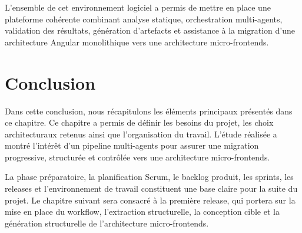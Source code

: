 





L'ensemble de cet environnement logiciel a permis de mettre en place une plateforme cohérente combinant analyse statique, orchestration multi-agents, validation des résultats, génération d'artefacts et assistance à la migration d'une architecture Angular monolithique vers une architecture micro-frontends.

\section*{Conclusion}

Dans cette conclusion, nous récapitulons les éléments principaux présentés dans ce chapitre. Ce chapitre a permis de définir les besoins du projet, les choix architecturaux retenus ainsi que l'organisation du travail. L'étude réalisée a montré l'intérêt d'un pipeline multi-agents pour assurer une migration progressive, structurée et contrôlée vers une architecture micro-frontends.

La phase préparatoire, la planification Scrum, le backlog produit, les sprints, les releases et l'environnement de travail constituent une base claire pour la suite du projet. Le chapitre suivant sera consacré à la première release, qui portera sur la mise en place du workflow, l'extraction structurelle, la conception cible et la génération structurelle de l'architecture micro-frontends.

